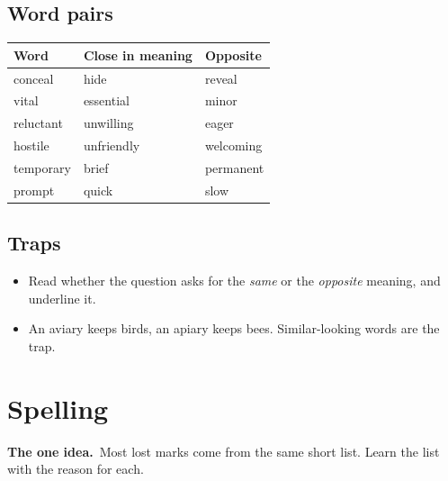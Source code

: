 \documentclass[11pt,a4paper]{article}
\let\oldsection\section
\renewcommand{\section}{\clearpage\oldsection}
\newcommand{\oneidea}[1]{\par\medskip\noindent\begingroup\setlength{\fboxsep}{7pt}%
  \colorbox{codebg}{\parbox{\dimexpr\linewidth-14pt\relax}{\textbf{\color{ember}The one idea.}\ #1}}\endgroup\par\medskip}
\begin{document}
\subsection*{Word pairs}
\begin{center}\small\renewcommand{\arraystretch}{1.2}
\begin{tabularx}{\linewidth}{@{}>{\raggedright\arraybackslash}X >{\raggedright\arraybackslash}X >{\raggedright\arraybackslash}X@{}}
\toprule
\textbf{Word} & \textbf{Close in meaning} & \textbf{Opposite}\\
\midrule
conceal & hide & reveal\\
vital & essential & minor\\
reluctant & unwilling & eager\\
hostile & unfriendly & welcoming\\
temporary & brief & permanent\\
prompt & quick & slow\\
\bottomrule
\end{tabularx}
\end{center}
\subsection*{Traps}
\begin{itemize}
\item Read whether the question asks for the \emph{same} or the \emph{opposite} meaning, and underline it.
\item An aviary keeps birds, an apiary keeps bees. Similar-looking words are the trap.
\end{itemize}

\section{Spelling}
\oneidea{Most lost marks come from the same short list. Learn the list with the reason for each.}
\end{document}
